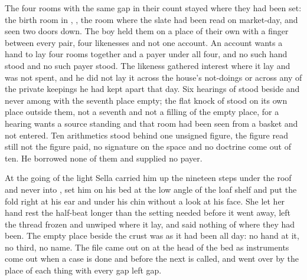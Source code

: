 \scenebreak

The four rooms with the same gap in their count stayed where they had been set: the birth room in , , the room where the slate had been read on market-day, and  seen two doors down. The boy held them on a place of their own with a finger between every pair, four likenesses and not one account. An account wants a hand to lay four rooms together and a payer under all four, and no such hand stood and no such payer stood. The likeness gathered interest where it lay and was not spent, and he did not lay it across the house's not-doings or across any of the private keepings he had kept apart that day. Six hearings of  stood beside and never among with the seventh place empty; the flat knock of  stood on its own place outside them, not a seventh and not a filling of the empty place, for a hearing wants a source standing and that room had been seen from a basket and not entered. Ten arithmetics stood behind one unsigned figure, the figure read still not the figure paid, no signature on the space and no doctrine come out of ten. He borrowed none of them and supplied no payer.

At the going of the light Sella carried him up the nineteen steps under the roof and never into , set him on his bed at the low angle of the loaf shelf and put the fold right at his ear and under his chin without a look at his face. She let her hand rest the half-beat longer than the setting needed before it went away, left the thread frozen and unwiped where it lay, and said nothing of where they had been. The empty place beside the crust was as it had been all day: no hand at it, no third, no name. The file came out on  at the head of the bed as instruments come out when a case is done and before the next is called, and went over by the place of each thing with every gap left gap.

